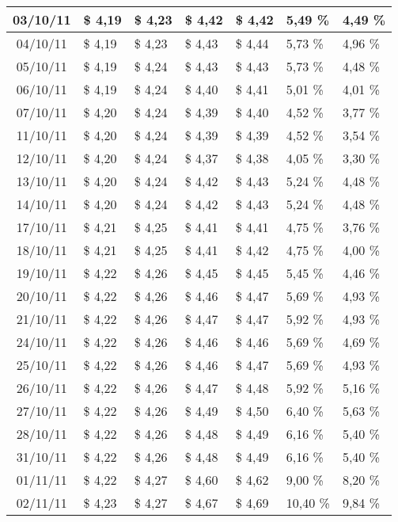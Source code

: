 \begin{center}
\begin{longtable}{|c|p{1.5cm}|p{1.5cm}|p{1.5cm}|p{1.5cm}|p{1.5cm}|p{1.5cm}|}
03/10/11 & \$ 4,19 & \$ 4,23 & \$ 4,42 & \$ 4,42 & 5,49 \% & 4,49 \% \\ \hline
04/10/11 & \$ 4,19 & \$ 4,23 & \$ 4,43 & \$ 4,44 & 5,73 \% & 4,96 \% \\ \hline
05/10/11 & \$ 4,19 & \$ 4,24 & \$ 4,43 & \$ 4,43 & 5,73 \% & 4,48 \% \\ \hline
06/10/11 & \$ 4,19 & \$ 4,24 & \$ 4,40 & \$ 4,41 & 5,01 \% & 4,01 \% \\ \hline
07/10/11 & \$ 4,20 & \$ 4,24 & \$ 4,39 & \$ 4,40 & 4,52 \% & 3,77 \% \\ \hline
11/10/11 & \$ 4,20 & \$ 4,24 & \$ 4,39 & \$ 4,39 & 4,52 \% & 3,54 \% \\ \hline
12/10/11 & \$ 4,20 & \$ 4,24 & \$ 4,37 & \$ 4,38 & 4,05 \% & 3,30 \% \\ \hline
13/10/11 & \$ 4,20 & \$ 4,24 & \$ 4,42 & \$ 4,43 & 5,24 \% & 4,48 \% \\ \hline
14/10/11 & \$ 4,20 & \$ 4,24 & \$ 4,42 & \$ 4,43 & 5,24 \% & 4,48 \% \\ \hline
17/10/11 & \$ 4,21 & \$ 4,25 & \$ 4,41 & \$ 4,41 & 4,75 \% & 3,76 \% \\ \hline
18/10/11 & \$ 4,21 & \$ 4,25 & \$ 4,41 & \$ 4,42 & 4,75 \% & 4,00 \% \\ \hline
19/10/11 & \$ 4,22 & \$ 4,26 & \$ 4,45 & \$ 4,45 & 5,45 \% & 4,46 \% \\ \hline
20/10/11 & \$ 4,22 & \$ 4,26 & \$ 4,46 & \$ 4,47 & 5,69 \% & 4,93 \% \\ \hline
21/10/11 & \$ 4,22 & \$ 4,26 & \$ 4,47 & \$ 4,47 & 5,92 \% & 4,93 \% \\ \hline
24/10/11 & \$ 4,22 & \$ 4,26 & \$ 4,46 & \$ 4,46 & 5,69 \% & 4,69 \% \\ \hline
25/10/11 & \$ 4,22 & \$ 4,26 & \$ 4,46 & \$ 4,47 & 5,69 \% & 4,93 \% \\ \hline
26/10/11 & \$ 4,22 & \$ 4,26 & \$ 4,47 & \$ 4,48 & 5,92 \% & 5,16 \% \\ \hline
27/10/11 & \$ 4,22 & \$ 4,26 & \$ 4,49 & \$ 4,50 & 6,40 \% & 5,63 \% \\ \hline
28/10/11 & \$ 4,22 & \$ 4,26 & \$ 4,48 & \$ 4,49 & 6,16 \% & 5,40 \% \\ \hline
31/10/11 & \$ 4,22 & \$ 4,26 & \$ 4,48 & \$ 4,49 & 6,16 \% & 5,40 \% \\ \hline
01/11/11 & \$ 4,22 & \$ 4,27 & \$ 4,60 & \$ 4,62 & 9,00 \% & 8,20 \% \\ \hline
02/11/11 & \$ 4,23 & \$ 4,27 & \$ 4,67 & \$ 4,69 & 10,40 \% & 9,84 \% \\ \hline

\end{longtable}
\end{center}
